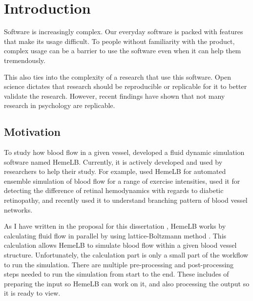 

\chapter[Introduction]{Introduction}

Software is increasingly complex. Our everyday software is packed with features that make its usage difficult. To people without familiarity with the product, complex usage can be a barrier to use the software even when it can help them tremendously. 

This also ties into the complexity of a research that use this software. Open science dictates that research should be reproducible or replicable for it to better validate the research. However, recent findings have shown that not many research in psychology are replicable.  


\section{Motivation}
To study how blood flow in a given vessel, \cite{mazzeo2008hemelb} developed a fluid dynamic simulation software named HemeLB. Currently, it is actively developed and used by researchers to help their study. For example, \cite{itani2015automated} used HemeLB for automated ensemble simulation of blood flow for a range of exercise intensities,  \cite{bernabeu2015characterization} used it for detecting the difference of retinal hemodynamics with regards to diabetic retinopathy, and recently \cite{franco2015dynamic,franco2016non} used it to understand branching pattern of blood vessel networks.

As I have written in the proposal for this dissertation \citep{Steven:2016aa}, HemeLB works by calculating fluid flow in parallel by using lattice-Boltzmann method \citep{mazzeo2008hemelb}. This calculation allows HemeLB to simulate blood flow within a given blood vessel structure. Unfortunately, the calculation part is only a small part of the workflow to run the simulation. There are multiple pre-processing and post-processing steps needed to run the simulation from start to the end. These includes of preparing the input so HemeLB can work on it, and also processing the output so it is ready to view.

